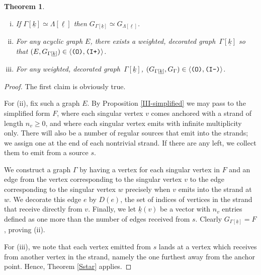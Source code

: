 \documentclass[12pt]{amsbook}%
\newtheorem{theor}{Theorem}[section]
\theoremstyle{defin}
\theoremstyle{remark}
\numberwithin{equation}{chapter}
\numberwithin{theor}{section}
\newcommand{\kk}{\underline{k}}
\newcommand{\IIIm}{\mbox{\texttt{\textup{(I-)}}}}
\newcommand{\IIIp}{\mbox{\texttt{\textup{(I+)}}}}
\newcommand{\OOO}{\mbox{\texttt{\textup{(O)}}}}
\newcommand{\WDG}{weighted, decorated graph}
\begin{document}
\begin{theor}\mbox{}
\begin{enumerate}[(i)]
\item  If $\Gamma[\underline{k}]\simeq \Lambda [\underline{\ell}]$ then $G_{\Gamma[\underline{k}]}\simeq G_{\Lambda[\underline{\ell}]}$.
\item For any acyclic graph $E$, there exists a \WDG\ $\Gamma[\underline k]$ so that $(E,G_{\Gamma[\underline k]})\in\langle \OOO,\IIIp\rangle$.
\item For any \WDG\ $\Gamma[\kk]$, $(G_{\Gamma[\kk]},G_\Gamma)\in \langle \OOO,\IIIm\rangle$.
\end{enumerate}
\end{theor}
\begin{proof}
The first claim is obviously true.

For (ii), fix such a graph $E$.
By Proposition \ref{III-simplified} we may pass to the  simplified form $F$, where each singular vertex $v$  comes anchored with a strand of length $n_v\geq 0$, and where each singular vertex emits with infinite multiplicity only. There will also be a number of regular sources that emit into the strands; we assign one at the end of each nontrivial strand. If there are any left, we collect them to emit from a source $s$.

We construct a graph $\Gamma$ by having a vertex for each singular vertex in $F$ and an edge from the vertex corresponding to the singular vertex $v$ to the edge corresponding to the singular vertex $w$ precisely when $v$ emits into the strand at $w$. We decorate this edge $e$ by $D(e)$, the set of indices of vertices in the strand that receive directly from $v$. Finally, we let $\underline{k}(v)$ be a vector with $n_v$ entries defined as one more than the number of edges received from $s$. Clearly $G_{\Gamma[\kk]}=F$, proving (ii).

For (iii), we note that each vertex emitted from $s$ lands at a vertex which receives from another vertex in the strand, namely the one furthest away from the anchor point. Hence, Theorem \ref{Sstar} applies.
\end{proof}
\end{document}
